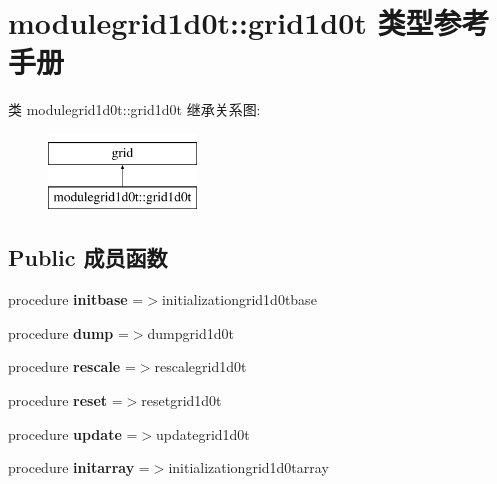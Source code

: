\hypertarget{structmodulegrid1d0t_1_1grid1d0t}{}\section{modulegrid1d0t\+::grid1d0t 类型参考手册}
\label{structmodulegrid1d0t_1_1grid1d0t}
类 modulegrid1d0t\+::grid1d0t 继承关系图\+:\begin{figure}[H]
\begin{center}
\leavevmode
\includegraphics[height=2.000000cm]{structmodulegrid1d0t_1_1grid1d0t}
\end{center}
\end{figure}
\subsection*{Public 成员函数}
\begin{DoxyCompactItemize}
\item 
\mbox{\label{structmodulegrid1d0t_1_1grid1d0t_a142fdd2a5f388859f5b1288a45e9a389}} 
procedure {\bfseries initbase} =$>$initializationgrid1d0tbase
\item 
\mbox{\label{structmodulegrid1d0t_1_1grid1d0t_a2a7811b5f47ea7e96dd0214768faa408}} 
procedure {\bfseries dump} =$>$dumpgrid1d0t
\item 
\mbox{\label{structmodulegrid1d0t_1_1grid1d0t_a1b563330936a1a2f976ba8079337cb68}} 
procedure {\bfseries rescale} =$>$rescalegrid1d0t
\item 
\mbox{\label{structmodulegrid1d0t_1_1grid1d0t_acaabd00a93e273d4e492d4c5b26e2434}} 
procedure {\bfseries reset} =$>$resetgrid1d0t
\item 
\mbox{\label{structmodulegrid1d0t_1_1grid1d0t_aeb97b0b9499b23824ae68bc7af716f75}} 
procedure {\bfseries update} =$>$updategrid1d0t
\item 
\mbox{\label{structmodulegrid1d0t_1_1grid1d0t_afc3abde68965658b8bc7e6e6cc4b56fd}} 
procedure {\bfseries initarray} =$>$initializationgrid1d0tarray
\end{DoxyCompactItemize}
